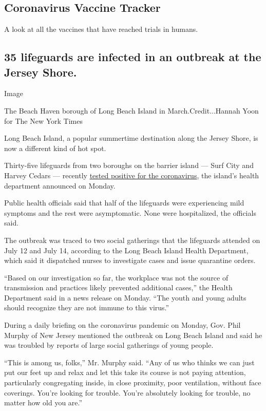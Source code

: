 \hypertarget{coronavirus-vaccine-tracker}{%
\subsection{Coronavirus Vaccine
Tracker}\label{coronavirus-vaccine-tracker}}

A look at all the vaccines that have reached trials in humans.

\hypertarget{35-lifeguards-are-infected-in-an-outbreak-at-the-jersey-shore}{%
\subsection{35 lifeguards are infected in an outbreak at the Jersey
Shore.}\label{35-lifeguards-are-infected-in-an-outbreak-at-the-jersey-shore}}

Image

The Beach Haven borough of Long Beach Island in March.Credit...Hannah
Yoon for The New York Times

Long Beach Island, a popular summertime destination along the Jersey
Shore, is now a different kind of hot spot.

Thirty-five lifeguards from two boroughs on the barrier island --- Surf
City and Harvey Cedars --- recently
\href{http://lbihealth.com/wp-content/uploads/2020/07/pressrelease727.pdf}{tested
positive for the coronavirus}, the island's health department announced
on Monday.

Public health officials said that half of the lifeguards were
experiencing mild symptoms and the rest were asymptomatic. None were
hospitalized, the officials said.

The outbreak was traced to two social gatherings that the lifeguards
attended on July 12 and July 14, according to the Long Beach Island
Health Department, which said it dispatched nurses to investigate cases
and issue quarantine orders.

``Based on our investigation so far, the workplace was not the source of
transmission and practices likely prevented additional cases,'' the
Health Department said in a news release on Monday. ``The youth and
young adults should recognize they are not immune to this virus.''

During a daily briefing on the coronavirus pandemic on Monday, Gov. Phil
Murphy of New Jersey mentioned the outbreak on Long Beach Island and
said he was troubled by reports of large social gatherings of young
people.

``This is among us, folks,'' Mr. Murphy said. ``Any of us who thinks we
can just put our feet up and relax and let this take its course is not
paying attention, particularly congregating inside, in close proximity,
poor ventilation, without face coverings. You're looking for trouble.
You're absolutely looking for trouble, no matter how old you are.''

